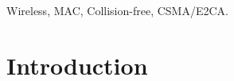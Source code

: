 \documentclass[conference]{IEEEtran}
\begin{document}
\begin{IEEEkeywords}
Wireless, MAC, Collision-free, CSMA/E2CA.
\end{IEEEkeywords}

\section{Introduction} \label{introduction}
  
  


  
\end{document}
